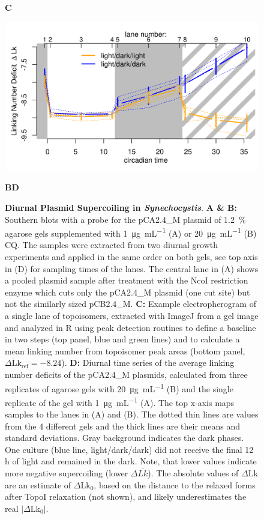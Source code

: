 \documentclass[10pt,a4]{article}
\newcommand{\ugml}{\micro\gram\per\milli\liter}
\newcommand{\scyst}{\textit{Synechocystis}}
\newcommand{\dlk}{\ensuremath{\Delta\text{Lk}}}
\newcommand{\dlkr}{\ensuremath{\Delta\text{Lk}_0}}
\begin{document}
\begin{figure}[ht!]
\begin{minipage}{.45\textwidth}
    \vspace{-.45cm}
    \textbf{C}
    
    \includegraphics[width=\textwidth]{figures/diurnal/linkingNumbers.png}
  \end{minipage}
  
  \vspace{-.5cm}
  \textbf{B}\hspace{.48\textwidth}\textbf{D}
  \vspace{.2cm}
  
  \caption{\textbf{Diurnal Plasmid Supercoiling in
      \scyst{}}. \textbf{A \& B:} Southern blots with a probe for the
    pCA2.4\_M plasmid of \SI{1.2}{\percent} agarose gels supplemented
    with \SI{1}{\ugml} (A) or \SI{20}{\ugml} (B) CQ. The samples were
    extracted from two diurnal growth experiments and applied in the
    same order on both gels, see top axis in (D) for sampling times
    of the lanes. The
    central lane in (A) shows a pooled plasmid sample after treatment
    with the NcoI restriction enzyme which cuts only the pCA2.4\_M
    plasmid (one cut site) but not the similarly sized
    pCB2.4\_M. \textbf{C:} Example electropherogram of a single lane
    of topoisomers, extracted with ImageJ from a gel image and analyzed
    in R using peak detection routines to define a baseline in two
    steps (top panel, blue and green lines) and to calculate a mean
    linking number from topoisomer peak areas (bottom panel,
    $\overline{\dlk}_\text{ref}=-8.24$).  \textbf{D:} Diurnal
    time series of the average linking number deficits of the
    pCA2.4\_M plasmids, calculated from three replicates of agarose
    gels with \SI{20}{\ugml} (B) and the single replicate of the gel
    with \SI{1}{\ugml} (A). The top x-axis maps samples to the
    lanes in (A) and (B). The dotted thin lines are values from the
    4 different gels and the thick lines are their means and standard
    deviations.  Gray background indicates the dark phases. One
    culture (blue line, light/dark/dark) did not receive the final 12
    h of light and remained in the dark.  Note, that lower values
    indicate more negative supercoiling (lower $\Delta
    \overline{Lk}$). The absolute values of $\dlk$ are an estimate of
    $\dlkr$, based on the distance to the relaxed forms after TopoI
    relaxation (not shown), and likely underestimates the real
    $|\dlkr|$.}
    \label{fig:blot} 
\end{figure}
\end{document}
